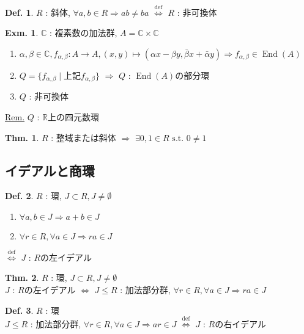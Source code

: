 \documentclass[uplatex,dvipdfmx,9pt]{beamer}
\newcommand{\defarrow}{\overset{\mathrm{def}}{\Leftrightarrow}}
\newcommand{\st}{\text{ s.t. }}
\newcommand{\End}{\operatorname{End}}
\newcommand{\sscount}{\textsection \thesubsection}
\newcounter{textExmCount}
\theoremstyle{definition} %
\newtheorem{defn}{Def.}[subsection] %
\newtheorem{thm}{Thm.}[subsection] %
\theoremstyle{example}
\newtheorem{exmText}[textExmCount]{Exm.}
\begin{document}
    \begin{frame}

      \begin{defn}
        $R$ : 斜体, $\forall a,b \in R \Rightarrow ab \neq ba$ $\defarrow$ $R$ : \alert{非可換体}
      \end{defn}

      \begin{exmText}
        $\mathbb{C}$ : 複素数の加法群, $A = \mathbb{C} \times \mathbb{C}$
        \begin{enumerate}
          \item $\alpha, \beta \in \mathbb{C}, f_{\alpha, \beta}\colon A \to A, (x,y) \mapsto (\alpha x - \beta y, \bar{\beta} x + \bar{\alpha} y) \Rightarrow f_{\alpha, \beta} \in \End(A)$
          \item $Q = \{f_{\alpha, \beta} \mid \text{上記$f_{\alpha, \beta}$}\}$ $\Rightarrow$ $Q$ : $\End(A)$の部分環
          \item $Q$ : 非可換体
        \end{enumerate}
      \end{exmText}
      \underline{Rem.} $Q$ : $\mathbb{R}$上の\alert{四元数環}

      \begin{thm}
        $R$ : 整域または斜体 $\Rightarrow$ $\exists 0, 1 \in R \st 0 \neq 1$
      \end{thm}
      
    \end{frame}

    \subsection{\sscount イデアルと商環}
    \setcounter{textExmCount}{0}

    \begin{frame}

      \begin{defn}
        $R$ : 環, $J \subset R, J \neq \emptyset$
        \begin{enumerate}
          \item $\forall a, b \in J \Rightarrow a + b \in J$
          \item $\forall r \in R, \forall a \in J \Rightarrow ra \in J$
        \end{enumerate}
        $\defarrow$ $J$ : $R$の\alert{左イデアル}
      \end{defn}

      \begin{thm}
        $R$ : 環, $J \subset R, J \neq \emptyset$ \\
        $J$ : $R$の左イデアル $\Leftrightarrow$ $J \le R$ : 加法部分群, $\forall r \in R, \forall a \in J \Rightarrow ra \in J$
      \end{thm}

      \begin{defn}
        $R$ : 環 \\
        $J \le R$ : 加法部分群, $\forall r \in R, \forall a \in J \Rightarrow ar \in J$ $\defarrow$ $J$ : $R$の\alert{右イデアル}
      \end{defn}

    \end{frame}
\end{document}
